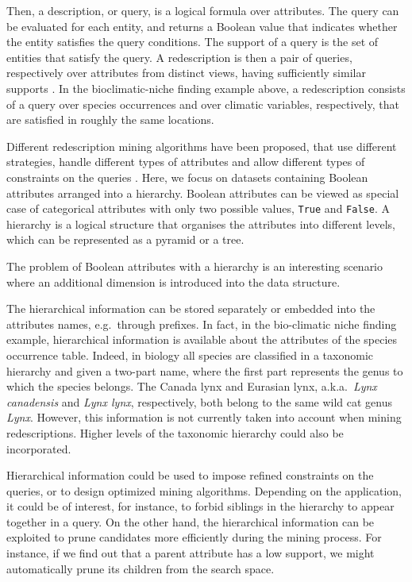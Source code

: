 \documentclass[12pt,a4paper]{article}
\begin{document}
Then, a description, or query, is a logical formula over attributes. The query can be evaluated for each entity, and returns a Boolean value that indicates whether the entity satisfies the query conditions. The support of a query is the set of entities that satisfy the query.
A redescription is then a pair of queries, respectively over attributes from distinct views, having sufficiently similar supports \cite{galbrun2018redescription}.
In the bioclimatic-niche finding example above, a redescription consists of a query over species occurrences and over climatic variables, respectively, that are satisfied in roughly the same locations.

Different redescription mining algorithms have been proposed, that use different strategies, handle different types of attributes and allow different types of constraints on the queries \cite{galbrun2018redescription}.
Here, we focus on datasets containing Boolean attributes arranged into a hierarchy.
Boolean attributes can be viewed as special case of categorical attributes with only two possible values, \texttt{True} and \texttt{False}.
A hierarchy is a logical structure that organises the attributes into different levels, which can be represented as a pyramid or a tree.

The problem of Boolean attributes with a hierarchy is an interesting scenario where an additional dimension is introduced into the data structure. 

The hierarchical information can be stored separately or embedded into the attributes names, e.g.\ through prefixes. 
In fact, in the bio-climatic niche finding example, hierarchical information is available about the attributes of the species occurrence table. Indeed, in biology all species are classified in a taxonomic hierarchy and given a two-part name, where the first part represents the genus to which the species belongs. The Canada lynx and Eurasian lynx, a.k.a.\ \textit{Lynx canadensis} and \textit{Lynx lynx}, respectively, both belong to the same wild cat genus \textit{Lynx}. However, this information is not currently taken into account when mining redescriptions. Higher levels of the taxonomic hierarchy could also be incorporated.

Hierarchical information could be used to impose refined constraints on the queries, or to design optimized mining algorithms. Depending on the application, it could be of interest, for instance, to forbid siblings in the hierarchy to appear together in a query.
On the other hand, the hierarchical information can be exploited to prune candidates more efficiently during the mining process. For instance, if we find out that a parent attribute has a low support, we might automatically prune its children from the search space.


\end{document}
